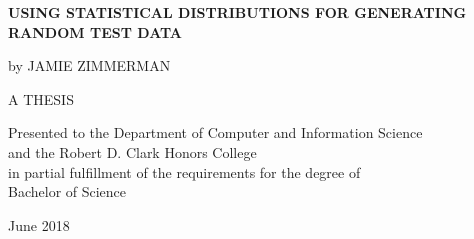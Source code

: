 \documentclass[12pt]{report}
\begin{document}
\begin{titlepage}
    \begin{center}
        \vspace*{1cm}
        
        \Large
        \textbf{USING STATISTICAL DISTRIBUTIONS FOR GENERATING RANDOM TEST DATA}
        
        \vspace{3.5cm}
        
        \large
        by
        \linebreak
        JAMIE ZIMMERMAN
        
        \vspace{3.5cm}
        
        \vfill

        \normalsize
        A THESIS
        \vspace{1.5cm}
        \begin{singlespace}
        Presented to the Department of Computer and Information Science \\
        and the Robert D. Clark Honors College \\
        in partial fulfillment of the requirements for the degree of \\
        Bachelor of Science
        \end{singlespace}
        
        \vspace{0.8cm}
        June 2018
        
    \end{center}
\end{titlepage}



\begin{romanpages}      %





\begin{center}
\tableofcontents
\end{center}



\begin{center}
\listoffigures
\end{center}


\newpage
\begin{center}
\listoftables
\end{center}


\end{romanpages}        %
\end{document}
